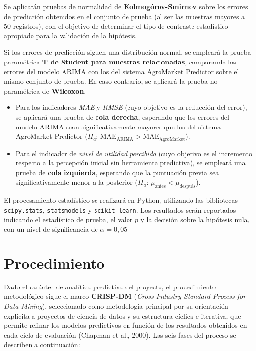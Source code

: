 \documentclass[12pt, a4paper]{report}
\begin{document}
Se aplicarán pruebas de normalidad de \textbf{Kolmogórov-Smirnov} sobre los errores de predicción obtenidos en el conjunto de prueba (al ser las muestras mayores a 50 registros), con el objetivo de determinar el tipo de contraste estadístico apropiado para la validación de la hipótesis.

Si los errores de predicción siguen una distribución normal, se empleará la prueba paramétrica \textbf{T de Student para muestras relacionadas}, comparando los errores del modelo ARIMA con los del sistema AgroMarket Predictor sobre el mismo conjunto de prueba. En caso contrario, se aplicará la prueba no paramétrica de \textbf{Wilcoxon}.

\begin{itemize}
  \item Para los indicadores \textit{MAE} y \textit{RMSE} (cuyo objetivo es la reducción del error), se aplicará una prueba de \textbf{cola derecha}, esperando que los errores del modelo ARIMA sean significativamente mayores que los del sistema AgroMarket Predictor ($H_a$: $\text{MAE}_{\text{ARIMA}} > \text{MAE}_{\text{AgroMarket}}$).

  \item Para el indicador de \textit{nivel de utilidad percibida} (cuyo objetivo es el incremento respecto a la percepción inicial sin herramienta predictiva), se empleará una prueba de \textbf{cola izquierda}, esperando que la puntuación previa sea significativamente menor a la posterior ($H_a$: $\mu_{\text{antes}} < \mu_{\text{después}}$).
\end{itemize}

El procesamiento estadístico se realizará en Python, utilizando las bibliotecas \texttt{scipy.stats}, \texttt{statsmodels} y \texttt{scikit-learn}. Los resultados serán reportados indicando el estadístico de prueba, el valor $p$ y la decisión sobre la hipótesis nula, con un nivel de significancia de $\alpha = 0{,}05$.

\section{Procedimiento}

Dado el carácter de analítica predictiva del proyecto, el procedimiento metodológico sigue el marco \textbf{CRISP-DM} (\textit{Cross Industry Standard Process for Data Mining}), seleccionado como metodología principal por su orientación explícita a proyectos de ciencia de datos y su estructura cíclica e iterativa, que permite refinar los modelos predictivos en función de los resultados obtenidos en cada ciclo de evaluación (Chapman et al., 2000). Las seis fases del proceso se describen a continuación:
\end{document}

